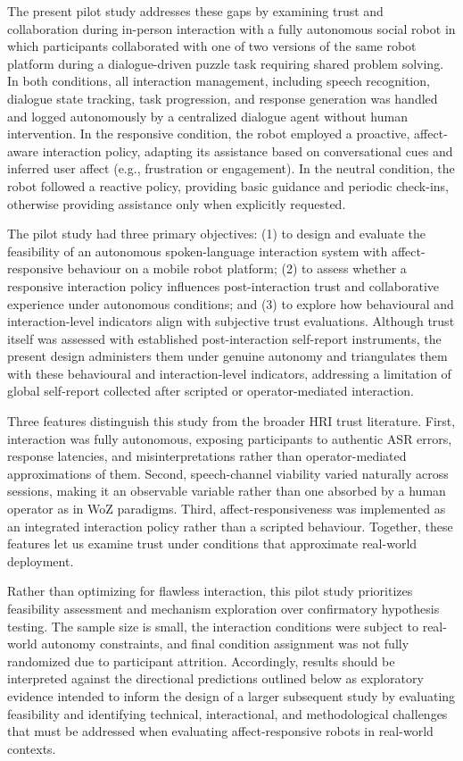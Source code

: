 \documentclass[
  authoryear,
  doubleblind,
  3p]{elsarticle}
\begin{document}
The present pilot study addresses these gaps by examining trust and
collaboration during in-person interaction with a fully autonomous
social robot in which participants collaborated with one of two versions
of the same robot platform during a dialogue-driven puzzle task
requiring shared problem solving. In both conditions, all interaction
management, including speech recognition, dialogue state tracking, task
progression, and response generation was handled and logged autonomously
by a centralized dialogue agent without human intervention. In the
responsive condition, the robot employed a proactive, affect-aware
interaction policy, adapting its assistance based on conversational cues
and inferred user affect (e.g., frustration or engagement). In the
neutral condition, the robot followed a reactive policy, providing basic
guidance and periodic check-ins, otherwise providing assistance only
when explicitly requested.

The pilot study had three primary objectives: (1) to design and evaluate
the feasibility of an autonomous spoken-language interaction system with
affect-responsive behaviour on a mobile robot platform; (2) to assess
whether a responsive interaction policy influences post-interaction
trust and collaborative experience under autonomous conditions; and (3)
to explore how behavioural and interaction-level indicators align with
subjective trust evaluations. Although trust itself was assessed with
established post-interaction self-report instruments, the present design
administers them under genuine autonomy and triangulates them with these
behavioural and interaction-level indicators, addressing a limitation of
global self-report collected after scripted or operator-mediated
interaction.

Three features distinguish this study from the broader HRI trust
literature. First, interaction was fully autonomous, exposing
participants to authentic ASR errors, response latencies, and
misinterpretations rather than operator-mediated approximations of them.
Second, speech-channel viability varied naturally across sessions,
making it an observable variable rather than one absorbed by a human
operator as in WoZ paradigms. Third, affect-responsiveness was
implemented as an integrated interaction policy rather than a scripted
behaviour. Together, these features let us examine trust under
conditions that approximate real-world deployment.

Rather than optimizing for flawless interaction, this pilot study
prioritizes feasibility assessment and mechanism exploration over
confirmatory hypothesis testing. The sample size is small, the
interaction conditions were subject to real-world autonomy constraints,
and final condition assignment was not fully randomized due to
participant attrition. Accordingly, results should be interpreted
against the directional predictions outlined below as exploratory
evidence intended to inform the design of a larger subsequent study by
evaluating feasibility and identifying technical, interactional, and
methodological challenges that must be addressed when evaluating
affect-responsive robots in real-world contexts.
\end{document}
